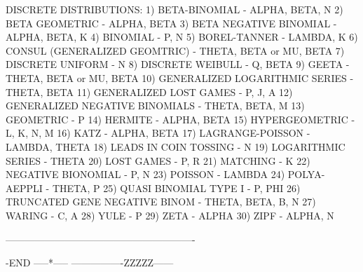 DISCRETE DISTRIBUTIONS:
      1) BETA-BINOMIAL                  - ALPHA, BETA, N
      2) BETA GEOMETRIC                 - ALPHA, BETA
      3) BETA NEGATIVE BINOMIAL         - ALPHA, BETA, K
      4) BINOMIAL                       - P, N
      5) BOREL-TANNER                   - LAMBDA, K
      6) CONSUL (GENERALIZED GEOMTRIC)  - THETA, BETA or MU, BETA
      7) DISCRETE UNIFORM               - N
      8) DISCRETE WEIBULL               - Q, BETA
      9) GEETA                          - THETA, BETA or MU, BETA
     10) GENERALIZED LOGARITHMIC SERIES - THETA, BETA
     11) GENERALIZED LOST GAMES         - P, J, A
     12) GENERALIZED NEGATIVE BINOMIALS - THETA, BETA, M
     13) GEOMETRIC                      - P
     14) HERMITE                        - ALPHA, BETA
     15) HYPERGEOMETRIC                 - L, K, N, M
     16) KATZ                           - ALPHA, BETA
     17) LAGRANGE-POISSON               - LAMBDA, THETA
     18) LEADS IN COIN TOSSING          - N
     19) LOGARITHMIC SERIES             - THETA
     20) LOST GAMES                     - P, R
     21) MATCHING                       - K
     22) NEGATIVE BIONOMIAL             - P, N
     23) POISSON                        - LAMBDA
     24) POLYA-AEPPLI                   - THETA, P
     25) QUASI BINOMIAL TYPE I          - P, PHI
     26) TRUNCATED GENE NEGATIVE BINOM  - THETA, BETA, B, N
     27) WARING                         - C, A
     28) YULE                           - P
     29) ZETA                           - ALPHA
     30) ZIPF                           - ALPHA, N


----------------------------------------------------------
















































































-END -----*-----      ----------------ZZZZZ------

